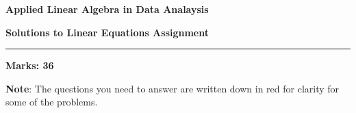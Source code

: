 \documentclass[12pt]{article}
\begin{document}
\begin{center}
\begin{large}
\textbf{Applied Linear Algebra in Data Analaysis}\\
\vspace{0.1cm}
\end{large}
\textbf{Solutions to Linear Equations Assignment}
\end{center}
\hrule
\vspace{1em}

\begin{large}
    \textbf{Marks: 36}
\end{large}
\vspace{0.2cm}

\textbf{Note}: The questions you need to answer are written down in red for clarity for some of the problems.
\end{document}
